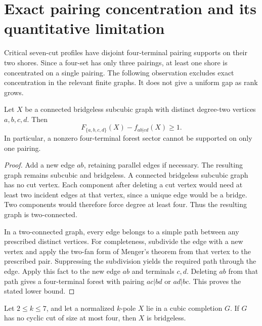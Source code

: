 \section{Exact pairing concentration and its quantitative limitation}
\label{sec:path-seven-pure-pair-notes}

Critical seven-cut profiles have disjoint four-terminal pairing supports on their two shores.
Since a four-set has only three pairings, at least one shore is concentrated on a single pairing.
The following observation excludes exact concentration in the relevant finite graphs.
It does not give a uniform gap as rank grows.

\begin{lemma}
\label{lem:path-seven-alternative-pairing}
Let $X$ be a connected bridgeless subcubic graph with distinct degree-two vertices $a,b,c,d$.
Then
\[
 F_{\{a,b,c,d\}}(X)-f_{ab|cd}(X)\ge1.
\]
In particular, a nonzero four-terminal forest sector cannot be supported on only one pairing.
\end{lemma}

\begin{proof}
Add a new edge $ab$, retaining parallel edges if necessary.
The resulting graph remains subcubic and bridgeless.
A connected bridgeless subcubic graph has no cut vertex.
Each component after deleting a cut vertex would need at least two incident edges at that vertex, since a unique edge would be a bridge.
Two components would therefore force degree at least four.
Thus the resulting graph is two-connected.

In a two-connected graph, every edge belongs to a simple path between any prescribed distinct vertices.
For completeness, subdivide the edge with a new vertex and apply the two-fan form of Menger's theorem from that vertex to the prescribed pair.
Suppressing the subdivision yields the required path through the edge.
Apply this fact to the new edge $ab$ and terminals $c,d$.
Deleting $ab$ from that path gives a four-terminal forest with pairing $ac|bd$ or $ad|bc$.
This proves the stated lower bound.
\end{proof}

\begin{lemma}
\label{lem:path-seven-poles-bridgeless}
Let $2\le k\le7$, and let a normalized $k$-pole $X$ lie in a cubic completion $G$.
If $G$ has no cyclic cut of size at most four, then $X$ is bridgeless.
\end{lemma}

